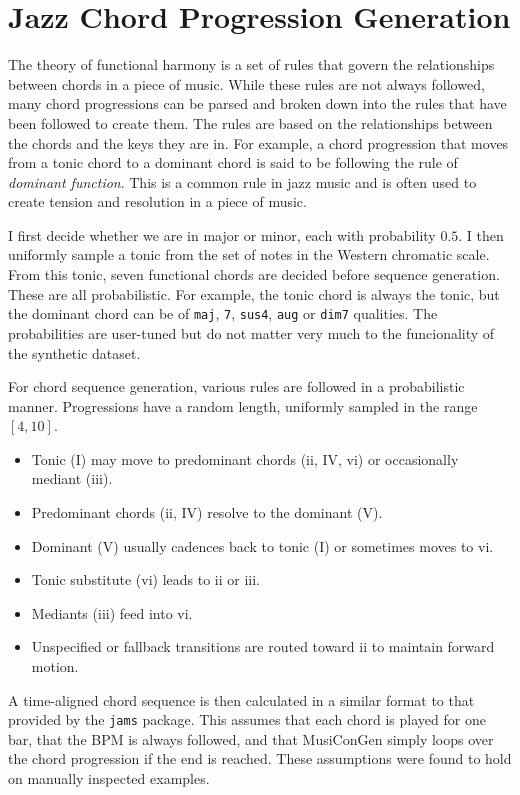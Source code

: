 \section{Jazz Chord Progression Generation}\label{app:jazz_chord_progression_generation}

The theory of functional harmony is a set of rules that govern the relationships between chords in a piece of music. While these rules are not always followed, many chord progressions can be parsed and broken down into the rules that have been followed to create them. The rules are based on the relationships between the chords and the keys they are in. For example, a chord progression that moves from a tonic chord to a dominant chord is said to be following the rule of \emph{dominant function}. This is a common rule in jazz music and is often used to create tension and resolution in a piece of music.

I first decide whether we are in major or minor, each with probability $0.5$. I then uniformly sample a tonic from the set of notes in the Western chromatic scale. From this tonic, seven functional chords are decided before sequence generation. These are all probabilistic. For example, the tonic chord is always the tonic, but the dominant chord can be of \texttt{maj}, \texttt{7}, \texttt{sus4}, \texttt{aug} or \texttt{dim7} qualities. The probabilities are user-tuned but do not matter very much to the funcionality of the synthetic dataset. 

For chord sequence generation, various rules are followed in a probabilistic manner. Progressions have a random length, uniformly sampled in the range $[4, 10]$.

\begin{itemize}
    \item Tonic (I) may move to predominant chords (ii, IV, vi) or occasionally mediant (iii).
    \item Predominant chords (ii, IV) resolve to the dominant (V).
    \item Dominant (V) usually cadences back to tonic (I) or sometimes moves to vi.
    \item Tonic substitute (vi) leads to ii or iii.
    \item Mediants (iii) feed into vi.
    \item Unspecified or fallback transitions are routed toward ii to maintain forward motion.
\end{itemize}

A time-aligned chord sequence is then calculated in a similar format to that provided by the \texttt{jams} package. This assumes that each chord is played for one bar, that the BPM is always followed, and that MusiConGen simply loops over the chord progression if the end is reached. These assumptions were found to hold on manually inspected examples.

